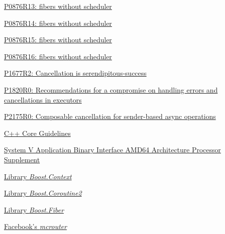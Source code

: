 \begin{thebibliography}{99}
        \href{https://www.open-std.org/jtc1/sc22/wg21/docs/papers/2023/p0876r13.pdf}
        {P0876R13: fibers without scheduler}

        \href{https://www.open-std.org/jtc1/sc22/wg21/docs/papers/2023/p0876r14.pdf}
        {P0876R14: fibers without scheduler}

        \href{https://www.open-std.org/jtc1/sc22/wg21/docs/papers/2024/p0876r15.pdf}
        {P0876R15: fibers without scheduler}

        \href{https://www.open-std.org/jtc1/sc22/wg21/docs/papers/2024/p0876r16.pdf}
        {P0876R16: fibers without scheduler}

        \href{https://www.open-std.org/jtc1/sc22/wg21/docs/papers/2019/p1677r2.pdf}
        {P1677R2: Cancellation is serendipitous-success}

        \href{https://www.open-std.org/jtc1/sc22/wg21/docs/papers/2019/p1820r0.html}
        {P1820R0: Recommendations for a compromise on handling errors and cancellations in executors}

        \href{https://www.open-std.org/jtc1/sc22/wg21/docs/papers/2020/p2175r0.html}
        {P2175R0: Composable cancellation for sender-based async operations}

        \href{http://isocpp.github.io/CppCoreGuidelines/CppCoreGuidelines#Ri-global}
        {C++ Core Guidelines}

        \href{http://software.intel.com/sites/default/files/article/402129/mpx-linux64-abi.pdf}
        {System V Application Binary Interface AMD64 Architecture Processor
        Supplement}

        \href{http://www.boost.org/doc/libs/release/libs/context/doc/html/index.html}
        {Library \emph{Boost.Context}}

        \href{http://www.boost.org/doc/libs/release/libs/coroutine2/doc/html/index.html}
        {Library \emph{Boost.Coroutine2}}

        \href{http://www.boost.org/doc/libs/release/libs/fiber/doc/html/index.html}
        {Library \emph{Boost.Fiber}}

        \href{https://code.facebook.com/posts/296442737213493/introducing-mcrouter-a-memcached-protocol-router-for-scaling-memcached-deployments}
        {Facebook's \emph{mcrouter}}


\end{thebibliography}
